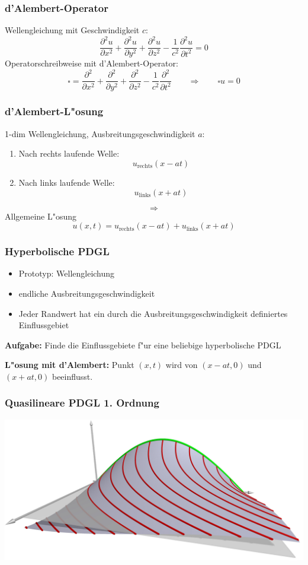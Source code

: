 \begin{frame}
\frametitle{d'Alembert-Operator}
Wellengleichung mit Geschwindigkeit $c$:
\[
\frac{\partial^2u}{\partial x^2}
+
\frac{\partial^2u}{\partial y^2}
+
\frac{\partial^2u}{\partial z^2}
-
\frac1{c^2}
\frac{\partial^2u}{\partial t^2}
=
0
\]
Operatorschreibweise mit d'Alembert-Operator:
\[
\square 
=
\frac{\partial^2}{\partial x^2}
+
\frac{\partial^2}{\partial y^2}
+
\frac{\partial^2}{\partial z^2}
-
\frac1{c^2}
\frac{\partial^2}{\partial t^2}
\qquad
\Rightarrow
\qquad
\square u=0
\]
\end{frame}

\begin{frame}
\frametitle{d'Alembert-L"osung}
1-dim Wellengleichung, Ausbreitungsgeschwindigkeit $a$:
\begin{enumerate}
\item
Nach rechts laufende Welle:
\[
u_{\text{rechts}}(x-at)
\]
\item
Nach links laufende Welle:
\[
u_{\text{links}}(x+at)
\]
\end{enumerate}
\pause
\[
\Rightarrow
\]
Allgemeine L"osung
\[
u(x,t)
=
u_{\text{rechts}}(x-at)
+
u_{\text{links}}(x+at)
\]
\end{frame}


\begin{frame}
\frametitle{Hyperbolische PDGL}

\begin{itemize}[<+->]
\item
Prototyp: Wellengleichung
\item
endliche Ausbreitungsgeschwindigkeit
\item
Jeder Randwert hat ein durch die Ausbreitungsgeschwindigkeit
definiertes Einflussgebiet
\end{itemize}
\pause
\bigskip

{\bf Aufgabe:}
Finde die Einflussgebiete f"ur eine beliebige hyperbolische PDGL
\bigskip

\pause
{\bf L"osung mit d'Alembert:}
Punkt $(x,t)$ wird von $(x-at,0)$ und $(x+at,0)$ beeinflusst.

\end{frame}

\begin{frame}
\frametitle{Quasilineare PDGL 1. Ordnung}
\begin{center}
\includegraphics[width=\hsize]{../../skript/3d/sol.jpg}
\end{center}
\end{frame}

